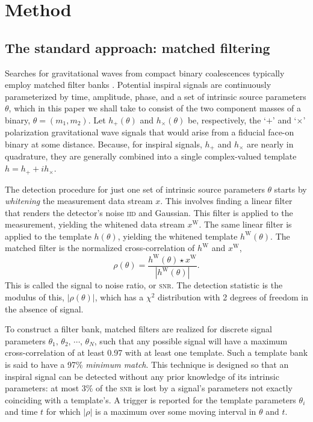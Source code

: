 \section{Method}
\label{SECII}\label{sec:method}
\subsection{The standard approach: matched filtering}

Searches for gravitational waves from compact binary coalescences typically
employ matched filter banks \cite{findchirppaper}.  Potential inspiral signals
are continuously parameterized by time, amplitude, phase, and a set of
intrinsic source parameters $\theta$, which in this paper we shall take to
consist of the two component masses of a binary, $\theta = (m_1, m_2)$.  Let
$h_+(\theta)$ and $h_\times(\theta)$ be, respectively, the `$+$' and `$\times$'
polarization gravitational wave signals that would arise from a fiducial
face-on binary at some distance.  Because, for inspiral signals, $h_+$ and
$h_\times$ are nearly in quadrature, they are generally combined into a single
complex-valued template $h = h_+ + i h_\times$.

The detection procedure for just one set of intrinsic source parameters
$\theta$ starts by {\em whitening} the measurement data stream $x$.  This
involves finding a linear filter that renders the detector's noise \textsc{iid}
and Gaussian.  This filter is applied to the measurement, yielding the whitened
data stream $x^\mathrm W$.  The same linear filter is applied to the template
$h(\theta)$, yielding the whitened template $h^\mathrm W (\theta)$.  The
matched filter is the normalized cross-correlation of $h^\mathrm W$ and
$x^\mathrm W$, 
%
$$
%
\rho(\theta) = \frac{h^\mathrm W (\theta) \star x^\mathrm W}{|h^\mathrm W
(\theta)|}.
%
$$
%
This is called the signal to noise ratio, or \textsc{snr}.  The detection
statistic is the modulus of this, $|\rho(\theta)|$, which has a $\chi^2$
distribution with 2 degrees of freedom in the absence of signal.

To construct a filter bank, matched filters are realized for discrete signal
parameters $\theta_1,\, \theta_2,\, \cdots$, $\theta_N$, such that any possible
signal will have a maximum cross-correlation of at least 0.97 with at least one
template.    Such
a template bank is said to have a 97\% {\em minimum match}.  This technique is
designed so that an inspiral signal can be detected without any prior knowledge
of its intrinsic parameters: at most 3\% of the \textsc{snr} is lost by a
signal's parameters not exactly coinciding with a template's.  A trigger is
reported for the template parameters $\theta_i$ and time $t$ for which $|\rho|$
is a maximum over some moving interval in $\theta$ and $t$.


